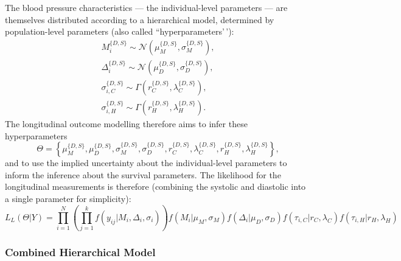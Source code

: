 \documentclass[
]{article}
\begin{document}
The blood pressure characteristics --- the individual-level parameters --- are themselves distributed according to a hierarchical model, determined by population-level parameters (also called ``hyperparameters'\,'):
\begin{equation}\label{priorsL}
\begin{aligned}
  M_i^{\{D,S\}}\sim \mathcal{N}(\mu_M^{\{D,S\}},\sigma_M^{\{D,S\}}),\\
  \Delta_i^{\{D,S\}}\sim \mathcal{N}(\mu_D^{\{D,S\}},\sigma_D^{\{D,S\}}),\\
  \sigma_{i,C}^{\{D,S\}}\sim \Gamma(r_C^{\{D,S\}},\lambda_C^{\{D,S\}}),\\
  \sigma_{i,H}^{\{D,S\}}\sim \Gamma(r_H^{\{D,S\}},\lambda_H^{\{D,S\}}).
\end{aligned}
\end{equation}
The longitudinal outcome modelling therefore aims to infer these hyperparameters
\begin{equation}
  \Theta=\left\{\mu_M^{\{D,S\}},\mu_D^{\{D,S\}},\sigma_M^{\{D,S\}},\sigma_D^{\{D,S\}},r_C^{\{D,S\}},\lambda_C^{\{D,S\}},r_H^{\{D,S\}},\lambda_H^{\{D,S\}}\right\},
\end{equation}
and to use the implied uncertainty about the individual-level parameters to inform the inference about the survival parameters.
The likelihood for the longitudinal measurements is therefore (combining the systolic and diastolic into a single parameter for simplicity):
\begin{equation}\label{likelong}
  L_L(\Theta|Y)=\prod_{i=1}^N\left(\prod_{j=1}^{k}f(y_{ij}|M_i,\Delta_i,\sigma_i)\right)f(M_i|\mu_M,\sigma_M)f(\Delta_i|\mu_D,\sigma_D)f(\tau_{i,C}|r_C,\lambda_C)f(\tau_{i,H}|r_H,\lambda_H)
\end{equation}

\hypertarget{combined-hierarchical-model}{%
\subsubsection{Combined Hierarchical Model}\label{combined-hierarchical-model}}
\end{document}
